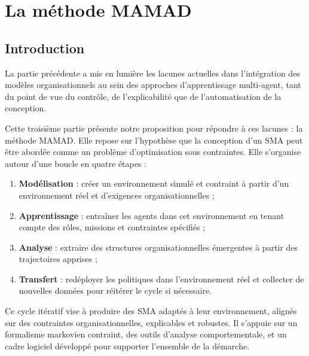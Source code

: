 \cleardoublepage
{}
\part{La méthode MAMAD}
\label{part:methode}

\chapter*{Introduction}

\noindent
La partie précédente a mis en lumière les lacunes actuelles dans l'intégration des modèles organisationnels au sein des approches d'apprentissage multi-agent, tant du point de vue du contrôle, de l'explicabilité que de l'automatisation de la conception.

\medskip

\noindent
Cette troisième partie présente notre proposition pour répondre à ces lacunes : la méthode \ac{MAMAD}. Elle repose sur l'hypothèse que la conception d'un \ac{SMA} peut être abordée comme un problème d'optimisation sous contraintes. Elle s'organise autour d'une boucle en quatre étapes :

\begin{enumerate}
    \item \textbf{Modélisation} : créer un environnement simulé et contraint à partir d'un environnement réel et d'exigences organisationnelles ;
    \item \textbf{Apprentissage} : entraîner les agents dans cet environnement en tenant compte des rôles, missions et contraintes spécifiés ;
    \item \textbf{Analyse} : extraire des structures organisationnelles émergentes à partir des trajectoires apprises ;
    \item \textbf{Transfert} : redéployer les politiques dans l'environnement réel et collecter de nouvelles données pour réitérer le cycle si nécessaire.
\end{enumerate}

\noindent
Ce cycle itératif vise à produire des \ac{SMA} adaptés à leur environnement, alignés sur des contraintes organisationnelles, explicables et robustes. Il s'appuie sur un formalisme markovien contraint, des outils d'analyse comportementale, et un cadre logiciel développé pour supporter l'ensemble de la démarche.

